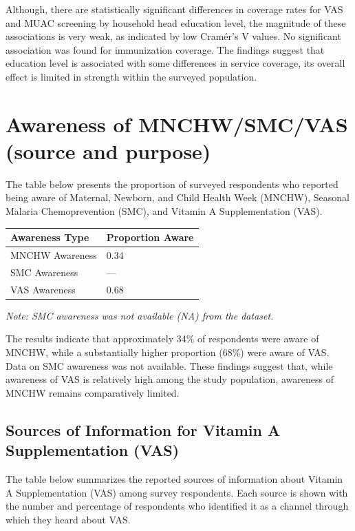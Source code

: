 \documentclass[
  11pt,
]{report}
\begin{document}
Although, there are statistically significant differences in coverage
rates for VAS and MUAC screening by household head education level, the
magnitude of these associations is very weak, as indicated by low
Cramér's V values. No significant association was found for immunization
coverage. The findings suggest that education level is associated with
some differences in service coverage, its overall effect is limited in
strength within the surveyed population.

\section{Awareness of MNCHW/SMC/VAS (source and
purpose)}\label{awareness-of-mnchwsmcvas-source-and-purpose}

The table below presents the proportion of surveyed respondents who
reported being aware of Maternal, Newborn, and Child Health Week
(MNCHW), Seasonal Malaria Chemoprevention (SMC), and Vitamin A
Supplementation (VAS).

\begin{longtable}[]{@{}ll@{}}
\toprule\noalign{}
Awareness Type & Proportion Aware \\
\midrule\noalign{}
\endhead
\bottomrule\noalign{}
\endlastfoot
MNCHW Awareness & 0.34 \\
SMC Awareness & --- \\
VAS Awareness & 0.68 \\
\end{longtable}

\emph{Note: SMC awareness was not available (NA) from the dataset.}

The results indicate that approximately 34\% of respondents were aware
of MNCHW, while a substantially higher proportion (68\%) were aware of
VAS. Data on SMC awareness was not available. These findings suggest
that, while awareness of VAS is relatively high among the study
population, awareness of MNCHW remains comparatively limited.

\subsection{Sources of Information for Vitamin A Supplementation
(VAS)}\label{sources-of-information-for-vitamin-a-supplementation-vas}

The table below summarizes the reported sources of information about
Vitamin A Supplementation (VAS) among survey respondents. Each source is
shown with the number and percentage of respondents who identified it as
a channel through which they heard about VAS.
\end{document}
